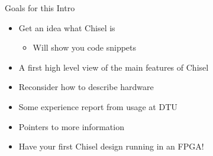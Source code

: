 \documentclass[xcolor=pdflatex,dvipsnames,table]{beamer}
\begin{document}
\begin{frame}[fragile]{Goals for this Intro}
\begin{itemize}
\item Get an idea what Chisel is
\begin{itemize}
\item Will show you code snippets
\end{itemize}
\item A first high level view of the main features of Chisel
\item Reconsider how to describe hardware
\item Some experience report from usage at DTU
\item Pointers to more information
\item Have your first Chisel design running in an FPGA!
\end{itemize}
\end{frame}

%
%
%
%
\end{document}
